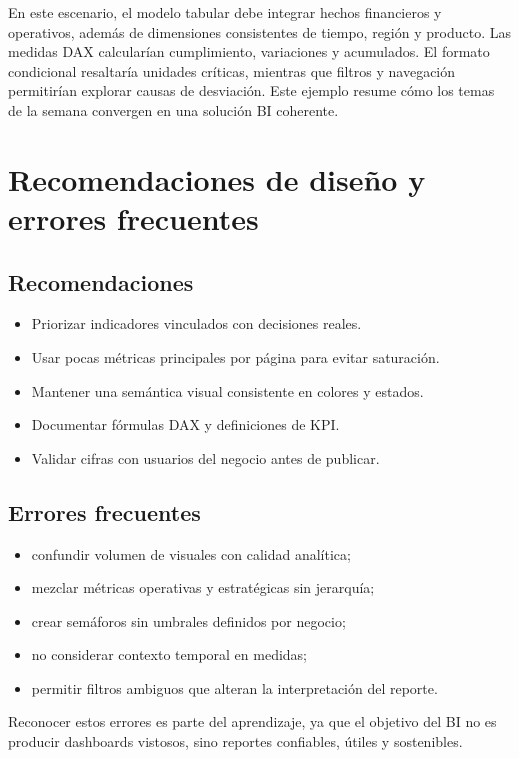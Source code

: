 \documentclass[12pt]{article}
\begin{document}
En este escenario, el modelo tabular debe integrar hechos financieros y operativos, además de dimensiones consistentes de tiempo, región y producto. Las medidas DAX calcularían cumplimiento, variaciones y acumulados. El formato condicional resaltaría unidades críticas, mientras que filtros y navegación permitirían explorar causas de desviación. Este ejemplo resume cómo los temas de la semana convergen en una solución BI coherente.

\section{Recomendaciones de diseño y errores frecuentes}
\subsection{Recomendaciones}
\begin{itemize}[leftmargin=*]
\item Priorizar indicadores vinculados con decisiones reales.
\item Usar pocas métricas principales por página para evitar saturación.
\item Mantener una semántica visual consistente en colores y estados.
\item Documentar fórmulas DAX y definiciones de KPI.
\item Validar cifras con usuarios del negocio antes de publicar.
\end{itemize}

\subsection{Errores frecuentes}
\begin{itemize}[leftmargin=*]
\item confundir volumen de visuales con calidad analítica;
\item mezclar métricas operativas y estratégicas sin jerarquía;
\item crear semáforos sin umbrales definidos por negocio;
\item no considerar contexto temporal en medidas;
\item permitir filtros ambiguos que alteran la interpretación del reporte.
\end{itemize}

Reconocer estos errores es parte del aprendizaje, ya que el objetivo del BI no es producir dashboards vistosos, sino reportes confiables, útiles y sostenibles.
\end{document}
